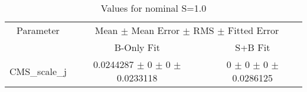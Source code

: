 \begin{table}
\centering
\caption{Values for nominal S=1.0}
\begin{tabular}{ccc}
\toprule
Parameter & \multicolumn{2}{c}{Mean $\pm$ Mean Error $\pm$ RMS $\pm$ Fitted Error}\\
 & B-Only Fit & S+B Fit\\
\midrule
CMS\_scale\_j & \num{0.0244287} $\pm$ \num{0} $\pm$ \num{0} $\pm$ \num{0.0233118} & \num{0} $\pm$ \num{0} $\pm$ \num{0} $\pm$ \num{0.0286125}\\
\bottomrule
\end{tabular}
\end{table}